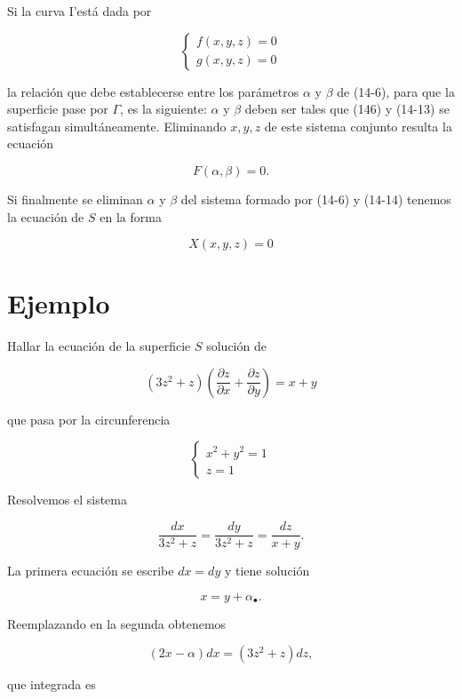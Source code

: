 \documentclass[10pt]{article}
\theoremstyle{plain}
\theoremstyle{definition}
\theoremstyle{remark}
\begin{document}
Si la curva I'está dada por

\[
\left\{\begin{array}{l}
f(x, y, z)=0  \tag{14-13}\\
g(x, y, z)=0
\end{array}\right.
\]

la relación que debe establecerse entre los parámetros $\alpha$ y $\beta$ de (14-6), para que la superficie pase por $\Gamma$, es la siguiente: $\alpha$ y $\beta$ deben ser tales que (146) y (14-13) se satisfagan simultáneamente. Eliminando $x, y, z$ de este sistema conjunto resulta la ecuación


\begin{equation*}
F(\alpha, \beta)=0 . \tag{14-14}
\end{equation*}


Si finalmente se eliminan $\alpha$ y $\beta$ del sistema formado por (14-6) y (14-14) tenemos la ecuación de $S$ en la forma

$$
X(x, y, z)=0
$$

\section*{Ejemplo}
Hallar la ecuación de la superficie $S$ solución de


\begin{equation*}
\left(3 z^{2}+z\right)\left(\frac{\partial z}{\partial x}+\frac{\partial z}{\partial y}\right)=x+y \tag{14-15}
\end{equation*}


que pasa por la circunferencia

$$
\left\{\begin{array}{l}
x^{2}+y^{2}=1 \\
z=1
\end{array}\right.
$$

Resolvemos el sistema


$$
\frac{d x}{3 z^{2}+z}=\frac{d y}{3 z^{2}+z}=\frac{d z}{x+y} .
$$

La primera ecuación se escribe $d x=d y$ y tiene solución


\begin{equation*}
x=y+\alpha_{\bullet} . \tag{14-16}
\end{equation*}


Reemplazando en la segunda obtenemos

$$
(2 x-\alpha) d x=\left(3 z^{2}+z\right) d z,
$$

que integrada es
\end{document}
